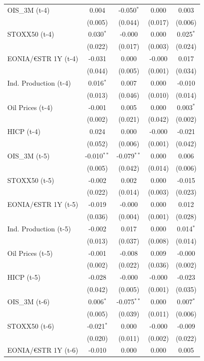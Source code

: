 \begin{longtable}[t]{lcccc}
OIS\_3M (t-4) & 0.004 & -0.050$^{*}$ & 0.000 & 0.003\\
 & (0.005) & (0.044) & (0.017) & (0.006)\\
STOXX50 (t-4) & 0.030$^{*}$ & -0.000 & 0.000 & 0.025$^{*}$\\
 & (0.022) & (0.017) & (0.003) & (0.024)\\
EONIA/€STR 1Y (t-4) & -0.031 & 0.000 & -0.000 & 0.017\\
 & (0.044) & (0.005) & (0.001) & (0.034)\\
Ind. Production (t-4) & 0.016$^{*}$ & 0.007 & 0.000 & -0.010\\
 & (0.013) & (0.046) & (0.010) & (0.014)\\
Oil Prices (t-4) & -0.001 & 0.005 & 0.000 & 0.003$^{*}$\\
 & (0.002) & (0.021) & (0.042) & (0.002)\\
HICP (t-4) & 0.024 & 0.000 & -0.000 & -0.021\\
 & (0.052) & (0.006) & (0.001) & (0.042)\\
OIS\_3M (t-5) & -0.010$^{**}$ & -0.079$^{**}$ & 0.000 & 0.006\\
 & (0.005) & (0.042) & (0.014) & (0.006)\\
STOXX50 (t-5) & -0.002 & 0.002 & 0.000 & -0.015\\
 & (0.022) & (0.014) & (0.003) & (0.023)\\
EONIA/€STR 1Y (t-5) & -0.019 & -0.000 & 0.000 & 0.012\\
 & (0.036) & (0.004) & (0.001) & (0.028)\\
Ind. Production (t-5) & -0.002 & 0.017 & 0.000 & 0.014$^{*}$\\
 & (0.013) & (0.037) & (0.008) & (0.014)\\
Oil Prices (t-5) & -0.001 & -0.008 & 0.009 & -0.000\\
 & (0.002) & (0.022) & (0.036) & (0.002)\\
HICP (t-5) & -0.028 & -0.000 & -0.000 & -0.023\\
 & (0.042) & (0.005) & (0.001) & (0.035)\\
OIS\_3M (t-6) & 0.006$^{*}$ & -0.075$^{**}$ & 0.000 & 0.007$^{*}$\\
 & (0.005) & (0.039) & (0.011) & (0.006)\\
STOXX50 (t-6) & -0.021$^{*}$ & 0.000 & -0.000 & -0.009\\
 & (0.020) & (0.011) & (0.002) & (0.022)\\
EONIA/€STR 1Y (t-6) & -0.010 & 0.000 & 0.000 & 0.005\\

\end{longtable}
